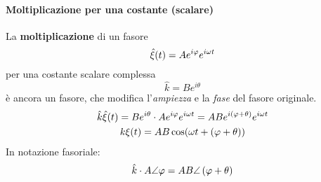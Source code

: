 \paragraph{Moltiplicazione per una costante (scalare)}
La \textbf{moltiplicazione} di un fasore
\begin{equation*}
	\hat{\xi}(t)=Ae^{i\oldphi}e^{i\omega t}
\end{equation*}
per una costante scalare complessa
\begin{equation*}
	\hat{k}=Be^{i\theta}
\end{equation*}
è ancora un fasore, che modifica l'\textit{ampiezza} e la \textit{fase} del fasore originale.
\begin{gather}
	\hat{k}\hat{\xi}(t)=Be^{i\theta}\cdot Ae^{i\oldphi}e^{i\omega t}=ABe^{i(\oldphi+\theta)}e^{i\omega t}\\
	k\xi(t)=AB\cos(\omega t+(\oldphi+\theta))
\end{gather}
In notazione fasoriale:
\begin{equation}
	\hat{k}\cdot A\angle\oldphi=AB\angle\left(\oldphi+\theta\right)
\end{equation}
